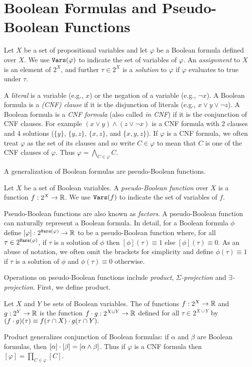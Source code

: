 \section{Boolean Formulas and Pseudo-Boolean Functions}
Let $X$ be a set of propositional variables and let $\varphi$ be a Boolean formula defined over $X$.
We use $\texttt{\upshape Vars}(\varphi)$ to indicate the set of variables of $\varphi$. An \emph{assignment} to $X$ is an element of $2^X$, and further $\tau \in 2^X$ is a \emph{solution} to $\varphi$ if $\varphi$ evaluates to true under $\tau$.

A \emph{literal} is a variable (e.g., $x$) or the negation of a variable (e.g., $\neg x$).
A Boolean formula is a \emph{(CNF) clause} if it is the disjunction of literals (e.g., $x \lor y \lor \neg z$). %
A Boolean formula is a \emph{CNF formula} (also called \emph{in CNF}) if it is the conjunction of CNF clauses.
For example $(x \lor y) \land (z \lor \neg x)$ is a CNF formula with 2 clauses and 4 solutions ($\{y\}$, $\{y, z\}$, $\{x, z\}$, and $\{x, y, z\}$).
If $\varphi$ is a CNF formula, we often treat $\varphi$ as the set of its clauses and so write $C \in \varphi$ to mean that $C$ is one of the CNF clauses of $\varphi$. Thus $\varphi = \bigwedge_{C \in \varphi} C$.

A generalization of Boolean formulas are pseudo-Boolean functions.
\begin{definition}
\label{def_pseudoboolean}
Let $X$ be a set of Boolean variables.
A \emph{pseudo-Boolean function} over $X$ is a function $f: 2^X \to \mathbb{R}$.
We use $\texttt{\upshape Vars}(f)$ to indicate the set of variables of $f$.
\end{definition}
Pseudo-Boolean functions are also known as \emph{factors}.
A pseudo-Boolean function can naturally represent a Boolean formula. In detail, for a Boolean formula $\phi$ define $[\varphi]: 2^{\texttt{\upshape Vars}(\varphi)} \rightarrow \mathbb{R}$ to be a pseudo-Boolean function where, for all $\tau \in 2^{\texttt{\upshape Vars}(\varphi)}$, if $\tau$ is a solution of $\phi$ then $[\phi](\tau) \equiv 1$ else $[\phi](\tau) \equiv 0$.
As an abuse of notation, we often omit the brackets for simplicity and define $\phi(\tau) \equiv 1$ if $\tau$ is a solution of $\phi$ and $\phi(\tau) \equiv 0$ otherwise.

Operations on pseudo-Boolean functions include \emph{product}, \emph{$\Sigma$-projection} and \emph{$\exists$-projection}.
First, we define product.
\begin{definition}[Product]
\label{def_mult}
    Let $X$ and $Y$ be sets of Boolean variables.
    The  of functions $f: 2^X \to \mathbb{R}$ and $g: 2^Y \to \mathbb{R}$ is the function $f \cdot g: 2^{X \cup Y} \to \mathbb{R}$ defined for all $\tau \in 2^{X \cup Y}$ by
    $(f \cdot g)(\tau) \equiv f(\tau \cap X) \cdot g(\tau \cap Y).$
\end{definition}
Product generalizes conjunction of Boolean formulas: if $\alpha$ and $\beta$ are Boolean formulas, then $[\alpha] \cdot [\beta] = [\alpha \land \beta]$. Thus if $\varphi$ is a CNF formula then $[\varphi] = \prod_{C \in \varphi} [C]$.

